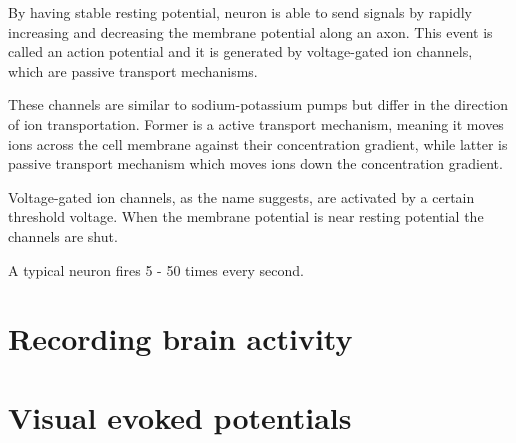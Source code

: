 By having stable resting potential, neuron is able to send signals by rapidly increasing and decreasing the membrane potential along an axon.
This event is called an action potential and it is generated by voltage-gated ion channels, which are passive transport mechanisms. 

These channels are similar to sodium-potassium pumps but differ in the direction of ion transportation. Former is a active transport mechanism, meaning it moves ions across the cell membrane against their concentration gradient, while latter is passive transport mechanism which moves ions down the concentration gradient.

Voltage-gated ion channels, as the name suggests, are activated by a certain threshold voltage. When the membrane potential is near resting potential the channels are shut. 

A typical neuron fires 5 - 50 times every second.
 
\section{Recording brain activity}
\section{Visual evoked potentials}
 